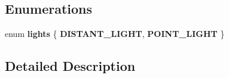 \subsection*{Enumerations}
\begin{DoxyCompactItemize}
\item 
enum {\bfseries lights} \{ {\bfseries D\+I\+S\+T\+A\+N\+T\+\_\+\+L\+I\+G\+HT}, 
{\bfseries P\+O\+I\+N\+T\+\_\+\+L\+I\+G\+HT}
 \}\hypertarget{group__lights_ga9364632a9ecc72c4ccec5a0db539657d}{}\label{group__lights_ga9364632a9ecc72c4ccec5a0db539657d}

\end{DoxyCompactItemize}


\subsection{Detailed Description}
